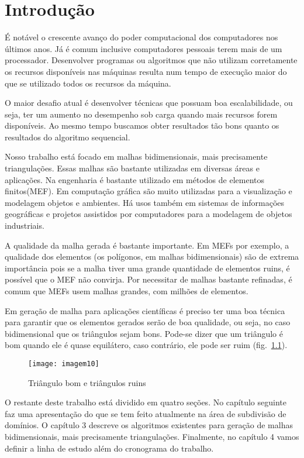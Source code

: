 \cleardoublepage
\pagestyle{fancy}

\chapter{Introdução}\label{intro}
É notável o crescente avanço do poder computacional dos computadores nos últimos anos. Já é comum inclusive computadores pessoais terem mais de um processador. Desenvolver programas ou algoritmos que não utilizam corretamente os recursos disponíveis nas máquinas resulta num tempo de execução maior do que se utilizado todos os recursos da máquina.

O maior desafio atual é desenvolver técnicas que possuam boa escalabilidade, ou seja, ter um aumento no desempenho sob carga quando mais recursos forem disponíveis. Ao mesmo tempo buscamos obter resultados tão bons quanto os resultados do algoritmo sequencial.

Nosso trabalho está focado em malhas bidimensionais, mais precisamente triangulações. Essas malhas são bastante utilizadas em diversas áreas e aplicações. Na engenharia é bastante utilizado em métodos de elementos finitos(MEF). Em computação gráfica são muito utilizadas para a visualização e modelagem objetos e ambientes. Há usos também em  sistemas de informações geográficas e projetos assistidos por computadores para a modelagem de objetos industriais.

A qualidade da malha gerada é bastante importante. Em MEFs por exemplo, a qualidade dos elementos (os polígonos, em malhas bidimensionais) são de extrema importância pois se a malha tiver uma grande quantidade de elementos ruins, é possível que o MEF não convirja. Por necessitar de malhas bastante refinadas, é comum que MEFs usem malhas grandes, com milhões de elementos.

Em geração de malha para aplicações científicas é preciso ter uma boa técnica para garantir que os elementos gerados serão de boa qualidade, ou seja, no caso bidimensional que os triângulos sejam bons. Pode-se dizer que um triângulo é bom quando ele é quase equilátero, caso contrário, ele pode ser ruim (fig.~\ref{fig:imagem10}).

 \begin{figure}[htbp]
     \centering
     \texttt{[image: imagem10]}
     \caption{Triângulo bom e triângulos ruins} 
     \label{fig:imagem10}
 \end{figure}

O restante deste trabalho está dividido em quatro seções. No capítulo seguinte faz uma apresentação do que se tem feito atualmente na área de subdivisão de domínios. O capítulo 3 descreve os algoritmos existentes para geração de malhas bidimensionais, mais precisamente triangulações. Finalmente, no capítulo 4 vamos definir a linha de estudo além do cronograma do trabalho.

